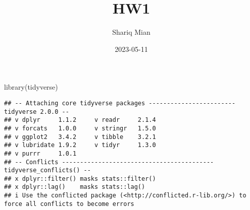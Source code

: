 \documentclass[
]{article}
\title{HW1}
\author{Shariq Mian}
\date{2023-05-11}
\newenvironment{Shaded}{\begin{snugshade}}{\end{snugshade}}
\newcommand{\FunctionTok}[1]{\textcolor[rgb]{0.00,0.00,0.00}{#1}}
\newcommand{\NormalTok}[1]{#1}
\begin{document}
\maketitle

\begin{Shaded}
\begin{Highlighting}[]
\FunctionTok{library}\NormalTok{(tidyverse)}
\end{Highlighting}
\end{Shaded}

\begin{verbatim}
## -- Attaching core tidyverse packages ------------------------ tidyverse 2.0.0 --
## v dplyr     1.1.2     v readr     2.1.4
## v forcats   1.0.0     v stringr   1.5.0
## v ggplot2   3.4.2     v tibble    3.2.1
## v lubridate 1.9.2     v tidyr     1.3.0
## v purrr     1.0.1     
## -- Conflicts ------------------------------------------ tidyverse_conflicts() --
## x dplyr::filter() masks stats::filter()
## x dplyr::lag()    masks stats::lag()
## i Use the conflicted package (<http://conflicted.r-lib.org/>) to force all conflicts to become errors
\end{verbatim}
\end{document}
